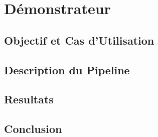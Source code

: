 \chapter{Démonstrateur}
\label{sec:demo}


\section{Objectif et Cas d'Utilisation}
\label{sec:demo:objectif}

\section{Description du Pipeline}
\label{sec:demo:motivation}

\section{Resultats}
\label{sec:demo:experimentations}

\section{Conclusion}
\label{sec:demo:conclusion}
